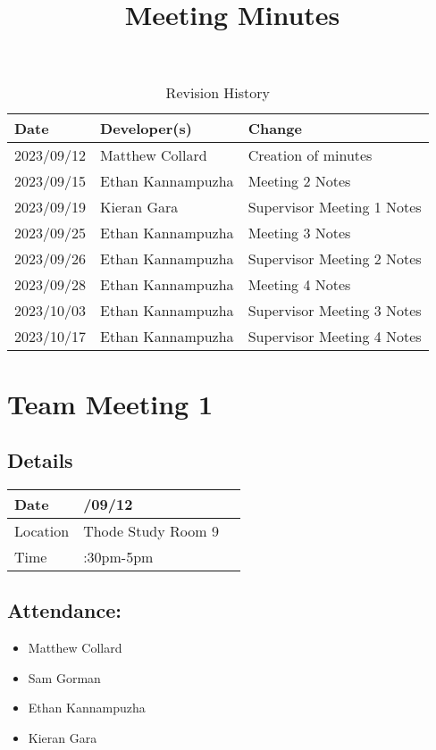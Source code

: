 \documentclass{article}
\title{Meeting Minutes\\\progname}
\author{\authname}
\date{}
\begin{document}
\maketitle

\begin{table}[hp]
\caption{Revision History} \label{TblRevisionHistory}
\begin{tabularx}{\textwidth}{llX}
\toprule
\textbf{Date} & \textbf{Developer(s)} & \textbf{Change}\\
\midrule
2023/09/12 & Matthew Collard & Creation of minutes\\
2023/09/15 & Ethan Kannampuzha & Meeting 2 Notes\\
2023/09/19 & Kieran Gara & Supervisor Meeting 1 Notes\\
2023/09/25 & Ethan Kannampuzha & Meeting 3 Notes\\
2023/09/26 & Ethan Kannampuzha & Supervisor Meeting 2 Notes\\
2023/09/28 & Ethan Kannampuzha & Meeting 4 Notes\\
2023/10/03 & Ethan Kannampuzha & Supervisor Meeting 3 Notes\\
2023/10/17 & Ethan Kannampuzha & Supervisor Meeting 4 Notes\\
\bottomrule
\end{tabularx}
\end{table}

\pagebreak
\section*{Team Meeting 1}
\subsection*{Details}

\begin{tabularx}{0.8\textwidth} { 
  | >{\raggedright\arraybackslash}X 
  | >{\centering\arraybackslash}X 
  | >{\raggedleft\arraybackslash}X | }
 \hline
 Date & 2023/09/12  \\
 \hline
 Location  & Thode Study Room 9  \\
\hline
Time  & 3:30pm-5pm  \\
\hline
\end{tabularx}


\subsection*{Attendance:}
\begin{itemize}
    \item Matthew Collard
    \item Sam Gorman
    \item Ethan Kannampuzha
    \item Kieran Gara
\end{itemize}
\end{document}
